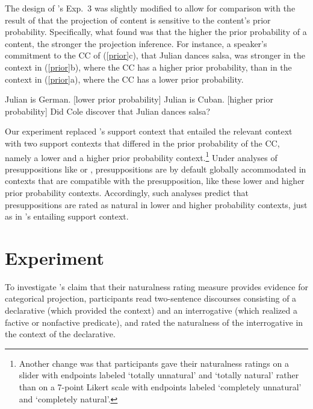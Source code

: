 \documentclass[11pt,fleqn]{article}
\newcommand{\6}{\mbox{$[\hspace*{-.6mm}[$}}
\newcommand{\9}{\mbox{$]\hspace*{-.6mm}]$}}
\newcommand{\citepos}[1]{\citeauthor{#1}'s \citeyear{#1}}
\begin{document}
The design of \citepos{mandelkern-etal2020} Exp.~3 was slightly modified to allow for comparison with the result of \citealt{degen-tonhauser-openmind} that the projection of content is sensitive to the content's prior probability. Specifically, what \citealt{degen-tonhauser-openmind} found was that the higher the prior probability of a content, the stronger the projection inference. For instance, a speaker's commitment to the CC of (\ref{prior}c), that Julian dances salsa, was stronger in the context in (\ref{prior}b), where the CC has a higher prior probability, than in the context in (\ref{prior}a), where the CC has a lower prior probability.

\begin{exe}
\ex\label{prior}
\begin{xlist}
\ex Julian is German. \hfill [lower prior probability]
\ex Julian is Cuban. \hfill [higher prior probability]
\ex Did Cole discover that Julian dances salsa?
\end{xlist}
\end{exe}
Our experiment replaced \citepos{mandelkern-etal2020} support context that entailed the relevant context with two support contexts that differed in the prior probability of the CC, namely a lower and a higher prior probability context.\footnote{Another change was that participants gave their naturalness ratings on a slider with endpoints labeled `totally unnatural' and `totally natural' rather than on a 7-point Likert scale with endpoints labeled `completely unnatural' and `completely natural'.}  Under analyses of presuppositions like \citealt{heim83} or \citealt{vds92}, presuppositions are by default globally accommodated in contexts that are compatible with the presupposition, like these lower and higher prior probability contexts. Accordingly, such analyses predict that presuppositions are rated as natural in lower and higher probability contexts, just as in \citepos{mandelkern-etal2020} entailing support context. 


\section{Experiment}\label{s2}

To investigate \citepos{mandelkern-etal2020} claim that their naturalness rating measure provides evidence for categorical projection, participants read two-sentence discourses consisting of a declarative (which provided the context) and an interrogative (which realized a factive or nonfactive predicate), and rated the naturalness of the interrogative in the context of the declarative.
\end{document}
